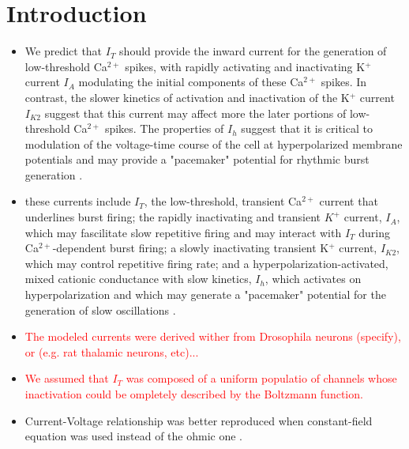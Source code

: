 \documentclass[./workflow.tex]{subfiles}
\begin{document}
    \section{Introduction}

    \begin{itemize}
        \item We predict that $I_T$ should provide the inward current for the generation of low-threshold
        Ca$^{2+}$ spikes, with rapidly activating and inactivating K$^+$ current $I_A$ modulating the
        initial components of these Ca$^{2+}$ spikes. In contrast, the slower kinetics of activation
        and inactivation of the K$^+$ current $I_{K2}$ suggest that this current may affect more the
        later portions of low-threshold Ca$^{2+}$ spikes. The properties of $I_h$ suggest that it is 
        critical to modulation of the voltage-time course of the cell at hyperpolarized membrane potentials and
        may provide a "pacemaker" potential for rhythmic burst generation
        \parencite{huguenardSimulationCurrentsInvolved1992}.

        \item these currents include $I_T$, the low-threshold, transient Ca$^{2+}$ current that underlines
        burst firing; the rapidly inactivating and transient $K^{+}$ current, $I_A$, which may fascilitate
        slow repetitive firing and may interact with $I_T$ during Ca$^{2+}$-dependent burst firing;
        a slowly inactivating transient K$^+$ current, $I_{K2}$, which may control repetitive firing rate;
        and a hyperpolarization-activated, mixed cationic conductance with slow kinetics, $I_h$, which activates
        on hyperpolarization and which may generate a "pacemaker" potential for the generation of slow
        oscillations \parencite{huguenardSimulationCurrentsInvolved1992}.

        \item \textcolor{red}{The modeled currents were derived wither from Drosophila neurons (specify),
        or (e.g. rat thalamic neurons, etc)...}

        \item \textcolor{red}{We assumed that $I_T$ was composed of a uniform populatio of channels
        whose inactivation could be ompletely described by the Boltzmann function.}

        \item Current-Voltage relationship was better reproduced when constant-field equation was
        used instead of the ohmic one \parencite{huguenardSimulationCurrentsInvolved1992}.


\end{itemize}
\end{document}
